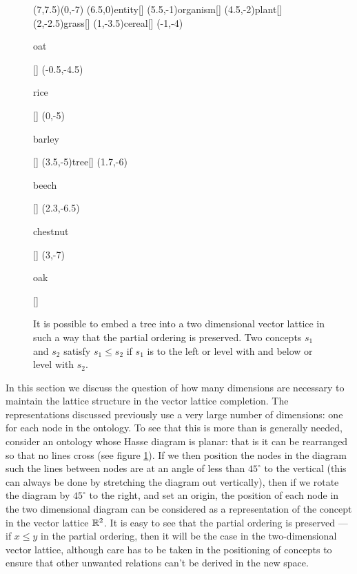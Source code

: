 \documentclass{report}
\begin{document}
\begin{figure}
\begin{center}
\begin{graph}(7,7.5)(0,-7)
(6.5,0){entity}[]
(5.5,-1){organism}[]
(4.5,-2){plant}[]
	(2,-2.5){grass}[]
	(1,-3.5){cereal}[]
		(-1,-4){\rule[-0.5ex]{0pt}{2.1ex}oat}[]
		(-0.5,-4.5){\rule[-0.5ex]{0pt}{2.1ex}rice}[]
		(0,-5){\rule[-0.5ex]{0pt}{2.1ex}barley}[]
	(3.5,-5){tree}[]
		(1.7,-6){\rule{0pt}{2ex}beech}[]
		(2.3,-6.5){\rule{0pt}{2ex}chestnut}[]
		(3,-7){\rule{0pt}{2ex}oak}[]



\end{graph}
\end{center}
\caption{It is possible to embed a tree into a two dimensional vector lattice in such a way that the partial ordering is preserved. Two concepts $s_1$ and $s_2$ satisfy $s_1 \le s_2$ if $s_1$ is to the left or level with and below or level with $s_2$.}
\label{plant-taxonomy-rot}
\end{figure}


In this section we discuss the question of how many dimensions are necessary to maintain the lattice structure in the vector lattice completion. The representations discussed previously use a very large number of dimensions: one for each node in the ontology. To see that this is more than is generally needed, consider an ontology whose Hasse diagram is planar: that is it can be rearranged so that no lines cross (see figure \ref{plant-taxonomy-rot}). If we then position the nodes in the diagram such the lines between nodes are at an angle of less than $45^\circ$ to the vertical (this can always be done by stretching the diagram out vertically), then if we rotate the diagram by $45^\circ$ to the right, and set an origin, the position of each node in the two dimensional diagram can be considered as a representation of the concept in the vector lattice $\mathbb{R}^2$. It is easy to see that the partial ordering is preserved --- if $x\le y$ in the partial ordering, then it will be the case in the two-dimensional vector lattice, although care has to be taken in the positioning of concepts to ensure that other unwanted relations can't be derived in the new space.
\end{document}
